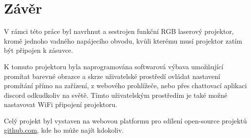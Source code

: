 \newpage
\chapter*{Závěr}

V rámci této práce byl navrhnut a sestrojen funkční RGB laserový projektor, kromě jednoho vadného napájecího obvodu, kvůli kterému musí projektor zatím být připojen k zásuvce.

K tomuto projektoru byla naprogramována softwarová výbava umožňující promítat barevné obrazce a skrze uživatelské prostředí ovládat nastavení promítání přímo na zařízení, z webového prohlížeče, nebo přes chattovací aplikaci discord odkudkoliv na světě. Tímto uživatelským prostředím je také možné nastavovat WiFi připojení projektoru.

Celý projekt byl vystaven na webovou platformu pro sdílení open-source projektů \url{github.com}, kde ho může najít kdokoliv.

